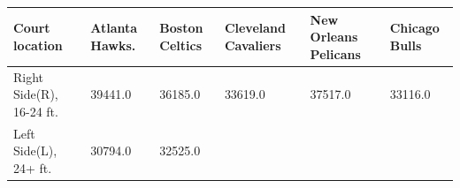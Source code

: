 \documentclass[]{article}
\begin{document}
\begin{longtable}[]{@{}llllll@{}}
\toprule
\begin{minipage}[b]{0.25\columnwidth}\raggedright
Court location\strut
\end{minipage} & \begin{minipage}[b]{0.12\columnwidth}\raggedright
Atlanta Hawks.\strut
\end{minipage} & \begin{minipage}[b]{0.12\columnwidth}\raggedright
Boston Celtics\strut
\end{minipage} & \begin{minipage}[b]{0.10\columnwidth}\raggedright
Cleveland Cavaliers\strut
\end{minipage} & \begin{minipage}[b]{0.12\columnwidth}\raggedright
New Orleans Pelicans\strut
\end{minipage} & \begin{minipage}[b]{0.12\columnwidth}\raggedright
Chicago Bulls\strut
\end{minipage}\tabularnewline
\midrule
\endhead
\begin{minipage}[t]{0.25\columnwidth}\raggedright
Right Side(R), 16-24 ft.\strut
\end{minipage} & \begin{minipage}[t]{0.12\columnwidth}\raggedright
39441.0\strut
\end{minipage} & \begin{minipage}[t]{0.12\columnwidth}\raggedright
36185.0\strut
\end{minipage} & \begin{minipage}[t]{0.10\columnwidth}\raggedright
33619.0\strut
\end{minipage} & \begin{minipage}[t]{0.12\columnwidth}\raggedright
37517.0\strut
\end{minipage} & \begin{minipage}[t]{0.12\columnwidth}\raggedright
33116.0\strut
\end{minipage}\tabularnewline
\begin{minipage}[t]{0.25\columnwidth}\raggedright
Left Side(L), 24+ ft.\strut
\end{minipage} & \begin{minipage}[t]{0.12\columnwidth}\raggedright
30794.0\strut
\end{minipage} & \begin{minipage}[t]{0.12\columnwidth}\raggedright
32525.0\strut
\end{minipage} & \begin{minipage}[t]{0.10\columnwidth}\raggedright

\end{minipage}
\end{longtable}
\end{document}
